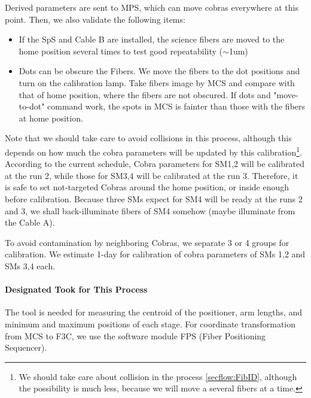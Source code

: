 
Derived parameters are sent to MPS, which can move cobras everywhere at this point.
Then, we also validate the following items:
\begin{itemize}
\item If the SpS and Cable B are installed, the science fibers are moved to the home position several times to test good repeatability ($\sim$1um)
\item Dots can be obscure the Fibers.
We move the fibers to the dot positions and turn on the calibration lamp.
Take fibers image by MCS and compare with that of home position, where the fibers are not obscured.
If dots and "move-to-dot" command work, the spots in MCS is fainter than those with the fibers at home position.
\end{itemize}

Note that we should take care to avoid collisions in this process, although this depends on how much the cobra parameters will be updated by this calibration\footnote{We should take care about collision in the process \ref{secflow:FibID}, although the possibility is much less, because we will move a several fibers at a time.}.
According to the current schedule, Cobra parameters for SM1,2 will be calibrated at the run 2, while those for SM3,4 will be calibrated at the run 3.
Therefore, it is safe to set not-targeted Cobras around the home position, or inside enough before calibration.
Because three SMs expect for SM4 will be ready at the runs 2 and 3, we shall back-illuminate fibers of SM4 somehow (maybe illuminate from the Cable A).

To avoid contamination by neighboring Cobras, we separate 3 or 4 groups for calibration. 
We estimate 1-day for calibration of cobra parameters of SMs 1,2 and SMs 3,4 each.


\paragraph{Designated Took for This Process}
The tool is needed for measuring the centroid of the positioner, arm lengths, and minimum and maximum positions of each stage.
For coordinate transformation from MCS to F3C, we use the software module FPS (Fiber Positioning Sequencer).

